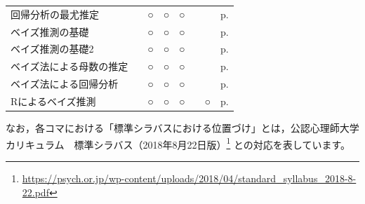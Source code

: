 \documentclass[uplatex]{jsarticle}
\begin{document}
\begin{table}
\begin{tabular}[t]{lccccccc}
       回帰分析の最尤推定 &  & ○ & ○ & ○ &  &  &  p.\pageref{lesson24}\\
       ベイズ推測の基礎 &  & ○ & ○ & ○ &  &  &  p.\pageref{lesson25}\\
       ベイズ推測の基礎2 &  & ○ & ○ & ○ &  &  &  p.\pageref{lesson26}\\
       ベイズ法による母数の推定 &  & ○ & ○ & ○ &  &  &  p.\pageref{lesson27}\\
       ベイズ法による回帰分析 &  & ○ & ○ & ○ &  &  &  p.\pageref{lesson28}\\
       Rによるベイズ推測 &  & ○ & ○ & ○ &  & ○ & p.\pageref{lesson29} \\\hline
\end{tabular}
\end{table}

なお，各コマにおける「標準シラバスにおける位置づけ」とは，公認心理師大学カリキュラム　標準シラバス（2018年8月22日版）\footnote{\url{https://psych.or.jp/wp-content/uploads/2018/04/standard_syllabus_2018-8-22.pdf}} との対応を表しています。


































\end{document}
